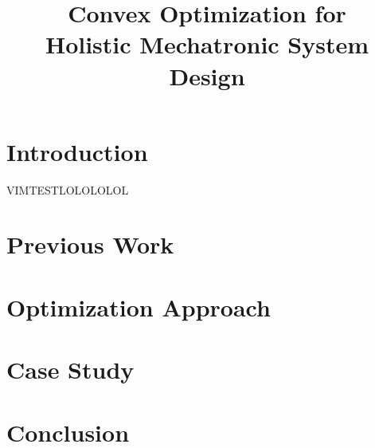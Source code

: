 \documentclass[conference]{IEEEtran}
\begin{document}
\title{Convex Optimization for \\Holistic Mechatronic System Design}



\maketitle %

\begin{abstract}

\end{abstract}

\section{Introduction}

VIMTESTLOLOLOLOL \cite{Mechatronics}

\section{Previous Work}


\section{Optimization Approach}


\section{Case Study}


\section{Conclusion}

\end{document}
